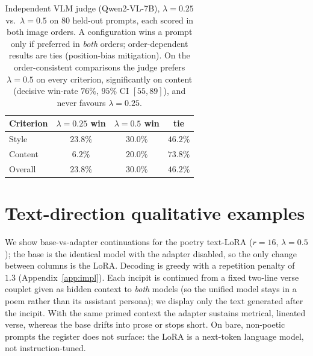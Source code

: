 \documentclass{article}
\begin{document}
\begin{table}[t]
\centering\small
\setlength{\tabcolsep}{8pt}
\begin{tabular}{lccc}
\toprule
Criterion & $\lambda{=}0.25$ win & $\lambda{=}0.5$ win & tie \\
\midrule
Style    & $23.8\%$ & $\mathbf{30.0\%}$ & $46.2\%$ \\
Content  & $6.2\%$  & $\mathbf{20.0\%}$ & $73.8\%$ \\
Overall  & $23.8\%$ & $\mathbf{30.0\%}$ & $46.2\%$ \\
\bottomrule
\end{tabular}
\caption{Independent VLM judge (Qwen2-VL-7B), $\lambda{=}0.25$ vs.\ $\lambda{=}0.5$
on $80$ held-out prompts, each scored in both image orders. A configuration wins a
prompt only if preferred in \emph{both} orders; order-dependent results are ties
(position-bias mitigation). On the order-consistent comparisons the judge prefers
$\lambda{=}0.5$ on every criterion, significantly on content (decisive win-rate
$76\%$, $95\%$ CI $[55,89]$), and never favours $\lambda{=}0.25$.}
\label{tab:judge}
\end{table}

\clearpage
\section{Text-direction qualitative examples}
\label{app:textqual}
We show base-vs-adapter continuations for the poetry text-LoRA ($r{=}16$,
$\lambda{=}0.5$); the base is the identical model with the adapter disabled, so the
only change between columns is the LoRA. Decoding is greedy with a repetition
penalty of $1.3$ (Appendix~\ref{app:impl}). Each incipit is continued from a fixed
two-line verse couplet given as hidden context to \emph{both} models (so the
unified model stays in a poem rather than its assistant persona); we display only
the text generated after the incipit. With the same primed context the adapter
sustains metrical, lineated verse, whereas the base drifts into prose or stops
short. On bare, non-poetic prompts the register does not surface: the LoRA is a
next-token language model, not instruction-tuned.
\end{document}
